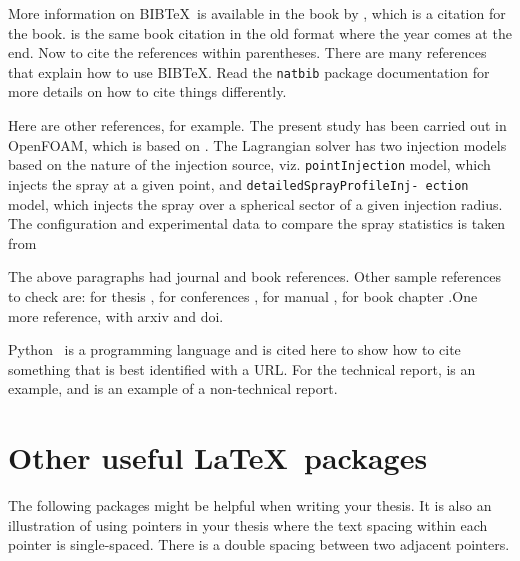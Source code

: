 More information on BIB\TeX\ is available in the book by \cite{lamport:86}, which is a citation for the book. \cite{lamport1:86} is the same book citation in the old format where the year comes at the end. Now to cite the references within parentheses. There are many references~\citep{lamport:86} that explain how to use BIB\TeX.  Read the \verb+natbib+ package documentation for more details on how to cite things differently.

Here are other references, for example.  The present study has been carried out in OpenFOAM, which is based on \cite{Weller1998}. The Lagrangian solver has two injection models based on the nature of the injection source, viz. \texttt{pointInjection} model, which injects the spray at a given point, and \texttt{detailedSprayProfileInj- ection} model, which injects the spray over a spherical sector of a given injection radius. The configuration and experimental data to compare the spray statistics is taken from \cite{Zhou2015a}

The above paragraphs had journal and book references. Other sample references to check are: for thesis \cite{Syed2013,Cheekati2014,Syed2020}, for conferences \cite{Sasidharan2017,Syed2018,Syed2018a}, for manual \cite{Ayachit2015},  for book chapter \cite{Ahren2005}.One more reference, \cite{Roenby2016} with arxiv and doi.

Python~\citep{py:python} is a programming language and is cited here to show how to cite something that is best identified with a URL. For the technical report, \cite{Syed2015} is an example, and \cite{UnitedNations2019} is an example of a non-technical report.

\section{Other useful \LaTeX\ packages}

The following packages might be helpful when writing your thesis. It is also an illustration of using pointers in your thesis where the text spacing within each pointer is single-spaced. There is a double spacing between two adjacent pointers.

